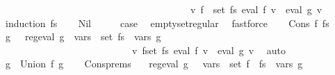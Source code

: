 \begin{isabellebody}
\ \ \ \ \ \ \ \ \ \ \ \ \ \ \ \ \ \ \ \ \ \ \ \ \ \ \ \ \ \ \ \ \ \ \ \ \ \ {\isasymand}\ {\isacharparenleft}{\kern0pt}{\isasymforall}v{\isachardot}{\kern0pt}\ {\isacharparenleft}{\kern0pt}{\isasymUnion}f\ {\isasymin}\ set\ fs{\isachardot}{\kern0pt}\ eval\ f\ v{\isacharparenright}{\kern0pt}\ {\isacharequal}{\kern0pt}\ eval\ g\ v{\isacharparenright}{\kern0pt}{\isachardoublequoteclose}\isanewline
%
\isadelimproof
%
\endisadelimproof
%
\isatagproof
{}\isamarkupfalse%
\ {\isacharparenleft}{\kern0pt}induction\ fs{\isacharparenright}{\kern0pt}\isanewline
\ \ \isamarkupfalse%
\ Nil\isanewline
\ \ \isamarkupfalse%
\ \isamarkupfalse%
\ {\isacharquery}{\kern0pt}case\ \isamarkupfalse%
\ emptyset{\isacharunderscore}{\kern0pt}regular\ \isamarkupfalse%
\ fastforce\isanewline
{}\isamarkupfalse%
\isanewline
\ \ \isamarkupfalse%
\ {\isacharparenleft}{\kern0pt}Cons\ f{}\ fs{\isacharparenright}{\kern0pt}\isanewline
\ \ \isamarkupfalse%
\ \isamarkupfalse%
\ g\ \ {\isacharasterisk}{\kern0pt}{\isacharcolon}{\kern0pt}\ {\isachardoublequoteopen}reg{\isacharunderscore}{\kern0pt}eval\ g\ {\isasymand}\ {\isasymUnion}{\isacharparenleft}{\kern0pt}vars\ {\isacharbackquote}{\kern0pt}\ set\ fs{\isacharparenright}{\kern0pt}\ {\isacharequal}{\kern0pt}\ vars\ g\isanewline
\ \ \ \ \ \ \ \ \ \ \ \ \ \ \ \ \ \ \ \ \ \ \ \ \ \ {\isasymand}\ {\isacharparenleft}{\kern0pt}{\isasymforall}v{\isachardot}{\kern0pt}\ {\isacharparenleft}{\kern0pt}{\isasymUnion}f{\isasymin}set\ fs{\isachardot}{\kern0pt}\ eval\ f\ v{\isacharparenright}{\kern0pt}\ {\isacharequal}{\kern0pt}\ eval\ g\ v{\isacharparenright}{\kern0pt}{\isachardoublequoteclose}\ \isamarkupfalse%
\ auto\isanewline
\ \ \isamarkupfalse%
\ {\isacharquery}{\kern0pt}g{\isacharprime}{\kern0pt}\ {\isacharequal}{\kern0pt}\ {\isachardoublequoteopen}Union\ f{}\ g{\isachardoublequoteclose}\isanewline
\ \ \isamarkupfalse%
\ Cons{\isachardot}{\kern0pt}prems\ {\isacharasterisk}{\kern0pt}\ \isamarkupfalse%
\ {\isachardoublequoteopen}reg{\isacharunderscore}{\kern0pt}eval\ {\isacharquery}{\kern0pt}g{\isacharprime}{\kern0pt}\ {\isasymand}\ {\isasymUnion}\ {\isacharparenleft}{\kern0pt}vars\ {\isacharbackquote}{\kern0pt}\ set\ {\isacharparenleft}{\kern0pt}f{}\ {\isacharhash}{\kern0pt}\ fs{\isacharparenright}{\kern0pt}{\isacharparenright}{\kern0pt}\ {\isacharequal}{\kern0pt}\ vars\ {\isacharquery}{\kern0pt}g{\isacharprime}{\kern0pt}\isanewline

\end{isabellebody}
